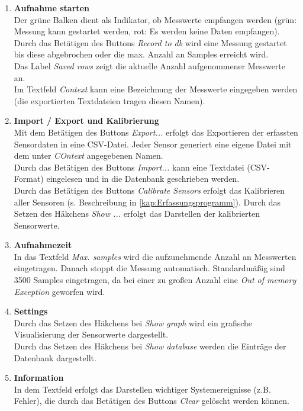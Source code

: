 \begin{enumerate}
	\item \textbf{Aufnahme starten} \\
	Der grüne Balken dient als Indikator, ob Messwerte empfangen werden (grün: Messung kann gestartet werden, rot: Es werden keine Daten empfangen).\\
	Durch das Betätigen des Buttons \textit{Record to db} wird eine Messung gestartet bis diese abgebrochen oder die max. Anzahl an Samples erreicht wird.\\
	Das Label \textit{Saved rows} zeigt die aktuelle Anzahl aufgenommener Messwerte an.\\
	Im Textfeld \textit{Context} kann eine Bezeichnung der Messwerte eingegeben werden (die exportierten Textdateien tragen diesen Namen).
	
	\item \textbf{Import / Export und Kalibrierung}\\
	Mit dem Betätigen des Buttons \textit{Export...} erfolgt das Exportieren der erfassten Sensordaten in eine CSV-Datei. Jeder Sensor generiert eine eigene Datei mit dem unter \textit{COntext} angegebenen Namen.\\
	Durch das Betätigen des Buttons \textit{Import...} kann eine Textdatei (CSV-Format) eingelesen und in die Datenbank geschrieben werden.\\
	Durch das Betätigen des Buttons \textit{Calibrate Sensors} erfolgt das Kalibrieren aller Sensoren (s. Beschreibung in \ref{kap:Erfassungsprogramm}). Durch das Setzen des Häkchens \textit{Show ...} erfolgt das Darstellen der kalibrierten Sensorwerte.
	
	\item \textbf{Aufnahmezeit}\\
	In das Textfeld \textit{Max. samples} wird die aufzunehmende Anzahl an Messwerten eingetragen. Danach stoppt die Messung automatisch. Standardmäßig sind 3500 Samples eingetragen, da bei einer zu großen Anzahl eine \textit{Out of memory Exception} geworfen wird.
	
	\item \textbf{Settings}\\
	Durch das Setzen des Häkchens bei \textit{Show graph} wird ein grafische Visualisierung der Sensorwerte dargestellt.\\
	Durch das Setzen des Häkchens bei \textit{Show database} werden die Einträge der Datenbank dargestellt.
	
	\item \textbf{Information}\\
	In dem Textfeld erfolgt das Darstellen wichtiger Systemereignisse (z.B. Fehler), die durch das Betätigen des Buttons \textit{Clear} gelöscht werden können.
\end{enumerate}

